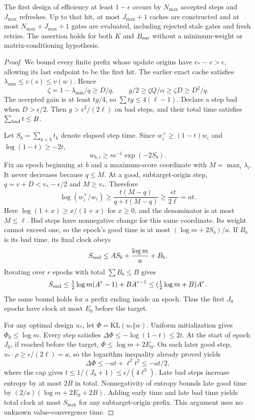 \documentclass[11pt]{article}
\begin{document}
\begin{proposition}
The first design of efficiency at least $1-\epsilon$ occurs by $N_{\max}$ accepted steps and $J_{\max}$ refreshes. Up to that hit, at most $J_{\max}+1$ caches are constructed and at most $N_{\max}+J_{\max}+1$ gates are evaluated, including rejected stale gates and fresh retries. The assertion holds for both $K$ and $B_{\rm sur}$ without a minimum-weight or matrix-conditioning hypothesis.
\end{proposition}
\begin{proof}
We bound every finite prefix whose update origins have $v_*-v>\epsilon$, allowing its last endpoint to be the first hit. The earlier exact cache satisfies $\lambda_{\min}\le v(s)\le v(w)$. Hence
\[
 \zeta=1-\lambda_{\min}/q\ge D/q,\qquad
 g/2\ge\zeta Q/\alpha\ge\zeta D\ge D^2/q.
\]
The accepted gain is at least $tg/4$, so $\sum tg\le4(\ell-1)$. Declare a step bad when $D>\epsilon/2$. Then $g>\epsilon^2/(2\ell)$ on bad steps, and their total time satisfies $\sum_{\rm bad}t\le B$.

Let $S_b=\sum_{k<b}t_k$ denote elapsed step time. Since $w_i^+\ge(1-t)w_i$ and $\log(1-t)\ge-2t$,
\[
 w_{b,i}\ge m^{-1}\exp(-2S_b).
\]
Fix an epoch beginning at $b$ and a maximum-score coordinate with $M=\max_i\lambda_i$. It never decreases because $q\le M$. At a good, subtarget-origin step, $q=v+D<v_*-\epsilon/2$ and $M\ge v_*$. Therefore
\[
 \log(w_i^+/w_i)
 \ge\frac{t(M-q)}{q+t(M-q)}\ge\frac{\epsilon t}{2\ell}=at.
\]
Here $\log(1+x)\ge x/(1+x)$ for $x\ge0$, and the denominator is at most $M\le\ell$. Bad steps have nonnegative change for this same coordinate. Its weight cannot exceed one, so the epoch's good time is at most $(\log m+2S_b)/a$. If $B_b$ is its bad time, its final clock obeys
\[
 S_{\rm end}\le A S_b+\frac{\log m}{a}+B_b.
\]
Iterating over $r$ epochs with total $\sum B_b\le B$ gives
\[
 S_{\rm end}\le\tfrac12\log m(A^r-1)+BA^{r-1}
 \le(\tfrac12\log m+B)A^r.
\]
The same bound holds for a prefix ending inside an epoch. Thus the first $J_0$ epochs have clock at most $E_0$ before the target.

For any optimal design $u_*$, let $\Phi=\mathrm{KL}(u_*\Vert w)$. Uniform initialization gives $\Phi_0\le\log m$. Every step satisfies $\Delta\Phi\le-\log(1-t)\le2t$. At the start of epoch $J_0$, if reached before the target, $\Phi\le\log m+2E_0$. On each later good step, $u_*\cdot\rho\ge\epsilon/(2\ell)=a$, so the logarithm inequality already proved yields
\[
 \Delta\Phi\le-at+\ell^2t^2\le-at/2,
\]
where the cap gives $t\le1/(J_0+1)\le\epsilon/(4\ell^3)$. Late bad steps increase entropy by at most $2B$ in total. Nonnegativity of entropy bounds late good time by
$(2/a)(\log m+2E_0+2B)$.
Adding early time and late bad time yields total clock at most $S_{\max}$ for any subtarget-origin prefix. This argument uses no unknown value-convergence time.


\end{proof}
\end{document}
